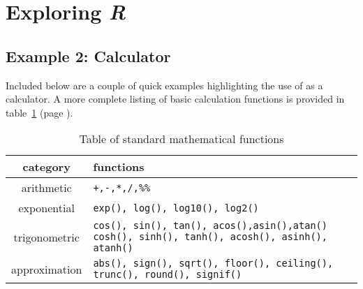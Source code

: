 \documentclass[10pt,letterpaper]{article}
\begin{document}


\section{Exploring \emph{R}} %
\label{sec:exploring_r}

\subsection{Example 2: Calculator} %
\label{sub:example_2_calculator}

Included below are a couple of quick examples highlighting the use of \R as a calculator.  A more complete listing of basic calculation functions is provided in table~\ref{tab:arith_table} (page \pageref{tab:arith_table}).


\begin{table}[htbp]
  \bc
  \begin{tabular}{cp{6cm}}
    \toprule
    category & functions \\
    \midrule
    arithmetic & \texttt{+,-,*,/,\%\%} \\
    exponential & \texttt{exp(), log(), log10(), log2()} \\
    trigonometric & \texttt{cos(), sin(), tan(), acos(),asin(),atan() cosh(), sinh(), tanh(), acosh(), asinh(), atanh()} \\
    approximation & \texttt{abs(), sign(), sqrt(), floor(), ceiling(), trunc(), round(), signif()} \\
    \bottomrule
  \end{tabular}
  \ec
  \caption{\label{tab:arith_table}Table of standard mathematical functions}
\end{table}
\end{document}
